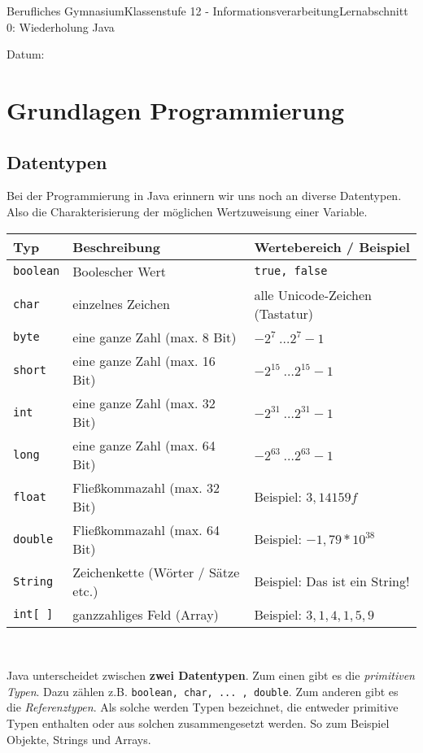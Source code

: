 \documentclass[11pt,oneside,openany,headings=optiontotoc,11pt,numbers=noenddot]{article}
\begin{document}
	\begin{worksheet}{Berufliches Gymnasium}{Klassenstufe 12 - Informationsverarbeitung}{Lernabschnitt 0: Wiederholung Java}
		\setlength{\columnseprule}{0pt}
		\begin{framed}
			Datum:
		\end{framed}
		\section{Grundlagen Programmierung}
		\subsection{Datentypen}
		\label{datyp}
		Bei der Programmierung in Java erinnern wir uns noch an diverse Datentypen. Also die Charakterisierung der möglichen Wertzuweisung einer Variable.\\
		\par\noindent
		\begin{tabularx}{\textwidth}{lXX}
			\textbf{Typ} & \textbf{Beschreibung} & \textbf{Wertebereich / Beispiel}\\
			\hline
			\hline
			{\lstinline[style=JavaInputStyle]{boolean}} & Boolescher Wert & {\lstinline[style=JavaInputStyle]{true, false}}\\
			\hline
			{\lstinline[style=JavaInputStyle]{char}} & einzelnes Zeichen & alle Unicode-Zeichen (Tastatur)\\
			\hline
			{\lstinline[style=JavaInputStyle]{byte}} & eine ganze Zahl (max. 8 Bit) & \(-2^7\ \ldots 2^7-1\)\\
			\hdashline
			{\lstinline[style=JavaInputStyle]{short}} & eine ganze Zahl (max. 16 Bit) & \(-2^{15}\ \ldots 2^{15}-1\)\\
			\hdashline
			{\lstinline[style=JavaInputStyle]{int}} & eine ganze Zahl (max. 32 Bit) & \(-2^{31}\ \ldots 2^{31}-1\)\\
			\hdashline
			{\lstinline[style=JavaInputStyle]{long}} & eine ganze Zahl (max. 64 Bit) & \(-2^{63}\ \ldots 2^{63}-1\)\\
			\hline
			{\lstinline[style=JavaInputStyle]{float}} & Fließkommazahl (max. 32 Bit) & Beispiel: \(3,14159f\)\\
			\hdashline
			{\lstinline[style=JavaInputStyle]{double}} & Fließkommazahl (max. 64 Bit) & Beispiel: \(-1,79 * 10^{38}\)\\
			\hline
			{\lstinline[style=JavaInputStyle]{String}} & Zeichenkette (Wörter / Sätze etc.) & Beispiel: \glqq{}Das ist ein String!\grqq{}\\
			\hdashline
			{\lstinline[style=JavaInputStyle]{int[ ]}} & ganzzahliges Feld (Array) & Beispiel: \({3,1,4,1,5,9}\)\\
			\hline
			\hline
		\end{tabularx}\\
		\par\noindent
		Java unterscheidet zwischen \textbf{zwei Datentypen}. Zum einen gibt es die \textit{primitiven Typen}. Dazu zählen z.B. \lstinline[style=JavaInputStyle]{boolean, char, ... , double}. Zum anderen gibt es die \textit{Referenztypen}. Als solche werden Typen bezeichnet, die entweder primitive Typen enthalten oder aus solchen zusammengesetzt werden. So zum Beispiel Objekte, Strings und Arrays.

\end{worksheet}
\end{document}
